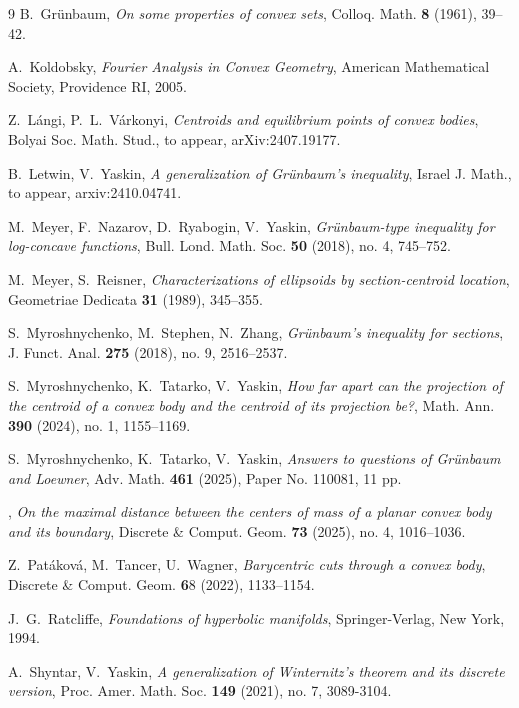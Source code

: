 \documentclass[12pt,letterpaper,reqno]{amsart}
\theoremstyle{definition}
\begin{document}
\begin{thebibliography}{9}
	 B.~Gr\"unbaum, {\em On some properties of convex sets}, Colloq. Math. {\bf 8} (1961), 39--42.

	
 
	
	  A.~Koldobsky, {\em Fourier Analysis in Convex Geometry}, American Mathematical Society, Providence RI, 2005.
	




Z.~L\'angi, P.~L.~V\'arkonyi, {\em Centroids and equilibrium points of convex bodies},  Bolyai Soc. Math. Stud., to appear, arXiv:2407.19177. 

 B.~Letwin, V.~Yaskin, {\em A generalization of Gr\"unbaum's inequality},  Israel J. Math., to appear, arxiv:2410.04741.
	
		M.~Meyer, F.~Nazarov, D.~Ryabogin, V.~Yaskin,
	{\em Gr\"unbaum-type inequality for log-concave functions}, Bull. Lond. Math. Soc. \textbf{50} (2018), no. 4, 745--752.
	
	
		 M.~Meyer, S.~Reisner, {\em Characterizations of ellipsoids by section-centroid location}, Geometriae
	Dedicata {\bf 31} (1989), 345--355.
	
			
	S.~Myroshnychenko, M.~Stephen, N.~Zhang, {\em Gr\"unbaum's inequality for sections}, J. Funct. Anal. \textbf{275} (2018), no. 9, 2516--2537.
	
	
			 {S.~Myroshnychenko, K.~Tatarko, V.~Yaskin}, {\em How far apart
		can the projection of the centroid of a convex body and the centroid
		of its projection be?}, Math. Ann. {\bf 390} (2024), no. 1, 1155--1169. 
	
		 S.~Myroshnychenko, K.~Tatarko, V.~Yaskin,   {\em  Answers to questions of Grünbaum and Loewner},
		Adv. Math. {\bf 461} (2025), Paper No. 110081, 11 pp.
		
				, {\em On the maximal distance between the centers of mass of a planar convex body and its boundary}, Discrete \& Comput. Geom. {\bf 73} (2025), no. 4, 1016--1036. 
				
				
					 Z.~Pat\'akov\'a, M.~Tancer, U.~Wagner, {\em Barycentric cuts through a convex body}, Discrete \& Comput. Geom. {\bf 6}8 (2022), 1133--1154.
					
					J.~G.~Ratcliffe, {\em Foundations of hyperbolic manifolds}, Springer-Verlag, New York,
					1994.
					
					 A.~Shyntar, V.~Yaskin, {\em A generalization of Winternitz's theorem and its discrete version},  Proc. Amer. Math. Soc. {\bf 149} (2021), no. 7, 3089-3104. 
					


\end{thebibliography}
\end{document}
